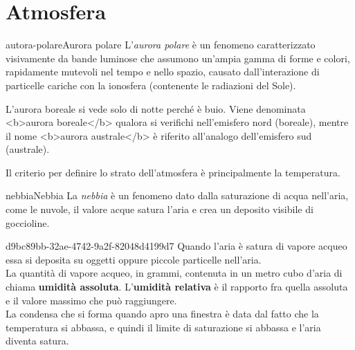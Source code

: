 \documentclass[preview]{standalone}
\begin{document}
\genpage

\section{Atmosfera}

\begin{snippetdefinition}{autora-polare}{Aurora polare}
    L'\textit{aurora polare} è un fenomeno
    caratterizzato visivamente da bande luminose che assumono un'ampia gamma di forme e colori, rapidamente mutevoli nel tempo e nello spazio,
    causato dall'interazione di particelle cariche con la ionosfera (contenente le radiazioni del Sole).
\end{snippetdefinition}


\begin{plainhtml}
    L'aurora boreale si vede solo di notte perché è buio.
    Viene denominata <b>aurora boreale</b> qualora si verifichi nell'emisfero nord (boreale),
    mentre il nome <b>aurora australe</b> è riferito all'analogo dell'emisfero sud (australe). 
\end{plainhtml}

\begin{plainhtml}
    Il criterio per definire lo strato dell'atmosfera è principalmente la temperatura.
\end{plainhtml}

\begin{snippetdefinition}{nebbia}{Nebbia}
    La \textit{nebbia} è un fenomeno dato dalla saturazione di acqua nell'aria,
    come le nuvole, il valore acque satura l'aria e crea un deposito visibile di goccioline.
\end{snippetdefinition}

\begin{snippet}{d9bc89bb-32ae-4742-9a2f-82048d4199d7}
    Quando l'aria è satura di vapore acqueo essa si deposita su oggetti oppure piccole particelle nell'aria.
    \\
    La quantità di vapore acqueo, in grammi, contenuta in un metro cubo d'aria di chiama \textbf{umidità assoluta}.
    L'\textbf{umidità relativa} è il rapporto fra quella assoluta e il valore massimo che può raggiungere.
    \\    
    La condensa che si forma quando apro una finestra è data dal fatto che la temperatura si abbassa, e quindi
    il limite di saturazione si abbassa e l'aria diventa satura.
\end{snippet}
\end{document}
